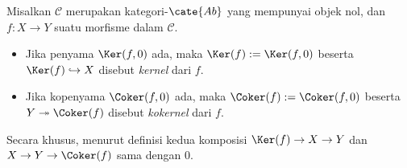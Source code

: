 \begin{definisi}
	 
	Misalkan $\mathcal{C}$ merupakan kategori-$\cate{Ab}$ yang mempunyai objek
	nol, dan $f: X \to Y$ suatu morfisme dalam $\mathcal{C}$.
	\begin{itemize}
		\item Jika penyama $\Ker(f,0)$ ada, maka $\Ker(f):=\Ker(f,0)$ beserta
		$\Ker(f) \hookrightarrow X$ disebut \emph{kernel} dari $f$.
		\item Jika kopenyama $\Coker(f,0)$ ada, maka $\Coker(f):=\Coker(f,0)$
		beserta $Y \twoheadrightarrow \Coker(f)$ disebut \emph{kokernel} dari
		$f$.
	\end{itemize}
	Secara khusus, menurut definisi kedua komposisi $\Ker(f) \to X \to Y$
	dan $X \to Y \to \Coker(f)$ sama dengan $0$.
\end{definisi}

